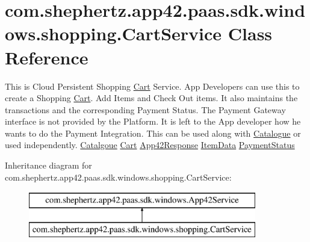 \hypertarget{classcom_1_1shephertz_1_1app42_1_1paas_1_1sdk_1_1windows_1_1shopping_1_1_cart_service}{\section{com.\+shephertz.\+app42.\+paas.\+sdk.\+windows.\+shopping.\+Cart\+Service Class Reference}
\label{classcom_1_1shephertz_1_1app42_1_1paas_1_1sdk_1_1windows_1_1shopping_1_1_cart_service}
}


This is Cloud Persistent Shopping \hyperlink{classcom_1_1shephertz_1_1app42_1_1paas_1_1sdk_1_1windows_1_1shopping_1_1_cart}{Cart} Service. App Developers can use this to create a Shopping \hyperlink{classcom_1_1shephertz_1_1app42_1_1paas_1_1sdk_1_1windows_1_1shopping_1_1_cart}{Cart}. Add Items and Check Out items. It also maintains the transactions and the corresponding Payment Status. The Payment Gateway interface is not provided by the Platform. It is left to the App developer how he wants to do the Payment Integration. This can be used along with \hyperlink{classcom_1_1shephertz_1_1app42_1_1paas_1_1sdk_1_1windows_1_1shopping_1_1_catalogue}{Catalogue} or used independently. \hyperlink{classcom_1_1shephertz_1_1app42_1_1paas_1_1sdk_1_1windows_1_1shopping_1_1_cart_service}{Catalgoue} \hyperlink{classcom_1_1shephertz_1_1app42_1_1paas_1_1sdk_1_1windows_1_1shopping_1_1_cart_service}{Cart} \hyperlink{classcom_1_1shephertz_1_1app42_1_1paas_1_1sdk_1_1windows_1_1shopping_1_1_cart_service}{App42\+Response} \hyperlink{classcom_1_1shephertz_1_1app42_1_1paas_1_1sdk_1_1windows_1_1shopping_1_1_cart_service}{Item\+Data} \hyperlink{classcom_1_1shephertz_1_1app42_1_1paas_1_1sdk_1_1windows_1_1shopping_1_1_cart_service}{Payment\+Status}  


Inheritance diagram for com.\+shephertz.\+app42.\+paas.\+sdk.\+windows.\+shopping.\+Cart\+Service\+:\begin{figure}[H]
\begin{center}
\leavevmode
\includegraphics[height=2.000000cm]{classcom_1_1shephertz_1_1app42_1_1paas_1_1sdk_1_1windows_1_1shopping_1_1_cart_service}
\end{center}
\end{figure}
